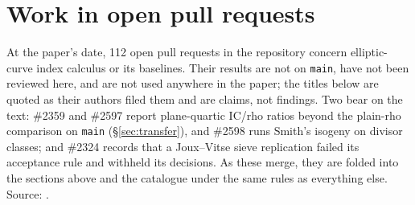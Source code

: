\section{Work in open pull requests}\label{sec:openprs}

At the paper's date, 112 open pull requests in the repository concern elliptic-curve index calculus or its baselines. Their results are not on \texttt{main}, have not been reviewed here, and are not used anywhere in the paper; the titles below are quoted as their authors filed them and are claims, not findings. Two bear on the text: \#2359 and \#2597 report plane-quartic IC/rho ratios beyond the plain-rho comparison on \texttt{main} (\S\ref{sec:transfer}), and \#2598 runs Smith's isogeny on divisor classes; and \#2324 records that a Joux--Vitse sieve replication failed its acceptance rule and withheld its decisions. As these merge, they are folded into the sections above and the catalogue under the same rules as everything else. Source: .

